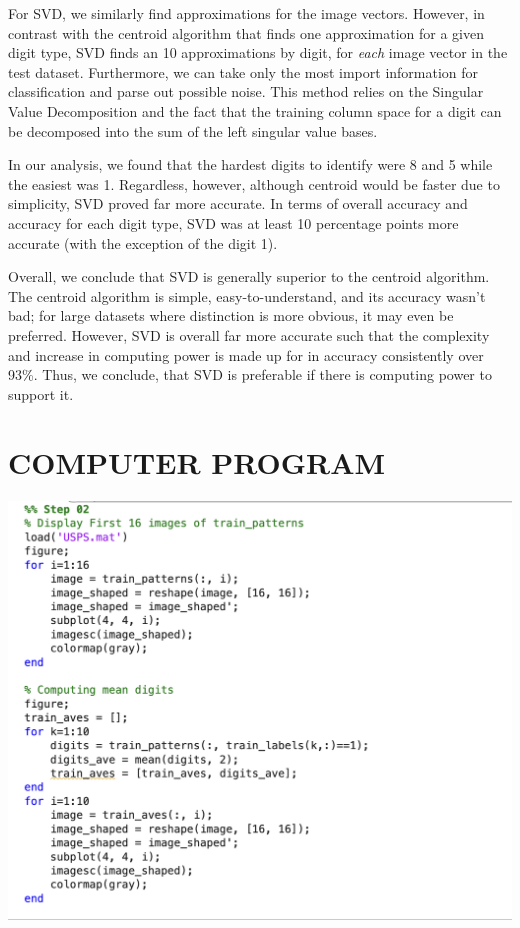 \documentclass[dvipsnames,12pt]{article} %
\begin{document}
    \vskip 06pt

    \hskip 12pt For SVD, we similarly find approximations for the image vectors. However, in contrast with the centroid algorithm that finds one approximation for a given digit type, SVD finds an 10 approximations by digit, for \textit{each} image vector in the test dataset. Furthermore, we can take only the most import information for classification and parse out possible noise. This method relies on the Singular Value Decomposition and the fact that the training column space for a digit can be decomposed into the sum of the left singular value bases.

    \vskip 06pt

    \hskip 12pt In our analysis, we found that the hardest digits to identify were 8 and 5 while the easiest was 1. Regardless, however, although centroid would be faster due to simplicity, SVD proved far more accurate. In terms of overall accuracy and accuracy for each digit type, SVD was at least 10 percentage points more accurate (with the exception of the digit 1). 

    \vskip 06pt

    \hskip 12pt Overall, we conclude that SVD is generally superior to the centroid algorithm. The centroid algorithm is simple, easy-to-understand, and its accuracy wasn't bad; for large datasets where distinction is more obvious, it may even be preferred. However, SVD is overall far more accurate such that the complexity and increase in computing power is made up for in accuracy consistently over 93\%. Thus, we conclude, that SVD is preferable if there is computing power to support it.

  \section{COMPUTER PROGRAM}
    \label{SECT 07:COMPUTER PROGRAM}

      \includegraphics[scale = 0.8]{Images/MAT 167 FPP Code 1.png}
\end{document}
